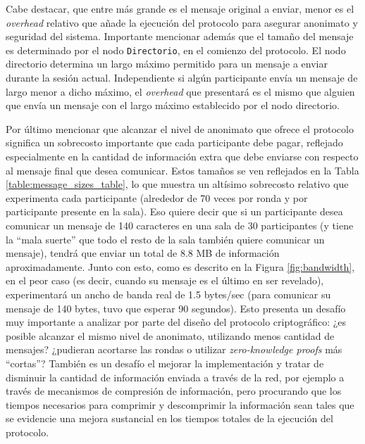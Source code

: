 Cabe destacar, que entre más grande es el mensaje original a enviar, menor es 
el \emph{overhead} relativo que añade la ejecución del protocolo para asegurar 
anonimato y seguridad del sistema. Importante mencionar además que el tamaño 
del mensaje es determinado por el nodo \texttt{Directorio}, en el comienzo del 
protocolo. El nodo directorio determina un largo máximo permitido para un 
mensaje a enviar durante la sesión actual. Independiente si algún participante 
envía un mensaje de largo menor a dicho máximo, el \emph{overhead} que 
presentará es el mismo que alguien que envía un mensaje con el largo máximo 
establecido por el nodo directorio.

Por último mencionar que alcanzar el nivel de anonimato 
que ofrece el protocolo significa un sobrecosto importante que cada 
participante debe pagar, reflejado especialmente en la cantidad de 
información extra que debe enviarse con respecto al mensaje final que 
desea comunicar. Estos tamaños se ven reflejados en la Tabla 
\ref{table:message_sizes_table}, lo que muestra un altísimo sobrecosto 
relativo que experimenta cada participante (alrededor de 70 veces por 
ronda y por participante presente en la sala). Eso quiere decir que si un 
participante desea comunicar un mensaje de 140 caracteres en una sala de 
30 participantes (y tiene la ``mala suerte'' que todo el resto de la sala 
también quiere comunicar un mensaje), tendrá que enviar un total de 8.8 MB 
de información aproximadamente. Junto con esto, como es descrito en la Figura 
\ref{fig:bandwidth}, en el peor caso (es decir, 
cuando su mensaje es el último en ser revelado), experimentará un ancho de 
banda real de 1.5 bytes/sec (para comunicar su mensaje de 140 bytes, tuvo 
que esperar 90 segundos). Esto presenta un desafío muy importante a 
analizar por parte del diseño del protocolo criptográfico: ¿es posible 
alcanzar el mismo nivel de anonimato, utilizando menos cantidad de 
mensajes? ¿pudieran acortarse las rondas o utilizar 
\emph{zero-knowledge proofs} más ``cortas''? También es un desafío el 
mejorar la implementación y tratar de disminuir la cantidad de información 
enviada a través de la red, por ejemplo a través de mecanismos de 
compresión de información, pero procurando que los tiempos necesarios para 
comprimir y descomprimir la información sean tales que se evidencie una 
mejora sustancial en los tiempos totales de la ejecución del protocolo.

